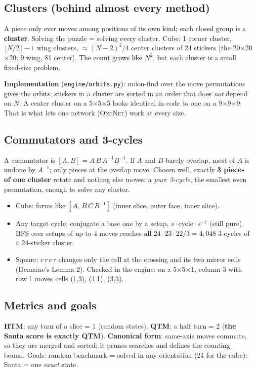 \documentclass[10.5pt,a4paper]{article}
\newcommand{\Cu}[1]{#1$\times$#1$\times$#1}
\newcommand{\Sq}[1]{#1$\times$#1$\times$1}
\newcommand{\M}[1]{\textsc{#1}}
\begin{document}
\subsection{Clusters (behind almost every method)}
A piece only ever moves among positions of its own kind; each closed group is a \textbf{cluster}. Solving the puzzle = solving
every cluster. Cube: 1 corner cluster, $\lfloor N/2\rfloor-1$ wing clusters, $\approx(N-2)^2/4$ center clusters of 24 stickers
(the \Cu{20}: 9 wing, 81 center). The count grows like $N^2$, but each cluster is a small fixed-size problem.

\textbf{Implementation} (\texttt{engine/orbits.py}): union-find over the move permutations gives the orbits; stickers in a
cluster are sorted in an order that does \emph{not} depend on $N$. A center cluster on a \Cu{5} looks identical in code to one
on a \Cu{9}. That is what lets one network (\M{OneNet}) work at every size.

\subsection{Commutators and 3-cycles}
A commutator is $[A,B]=A\,B\,A^{-1}B^{-1}$. If $A$ and $B$ barely overlap, most of $A$ is undone by $A^{-1}$; only pieces at the
overlap move. Chosen well, exactly \textbf{3 pieces of one cluster} rotate and nothing else moves: a \emph{pure 3-cycle}, the
smallest even permutation, enough to solve any cluster.
\begin{itemize}
\item Cube: forms like $[A,\,B\,C\,B^{-1}]$ (inner slice, outer face, inner slice).
\item Any target cycle: conjugate a base one by a setup, $s\cdot\text{cycle}\cdot s^{-1}$ (still pure). BFS over setups of up to
4 moves reaches all $24\cdot23\cdot22/3=4{,}048$ 3-cycles of a 24-sticker cluster.
\item Square: $c\,r\,c\,r$ changes only the cell at the crossing and its two mirror cells (Demaine's Lemma 2). Checked in the
engine: on a \Sq{5}, column 3 with row 1 moves cells (1,3), (1,1), (3,3).
\end{itemize}

\subsection{Metrics and goals}
\textbf{HTM}: any turn of a slice = 1 (random states). \textbf{QTM}: a half turn = 2 (\textbf{the Santa score is exactly
QTM}). \textbf{Canonical form}: same-axis moves commute, so they are merged and sorted; it prunes searches and defines the
counting bound. Goals: random benchmark = solved in any orientation (24 for the cube); Santa = one \emph{exact} state.
\end{document}
